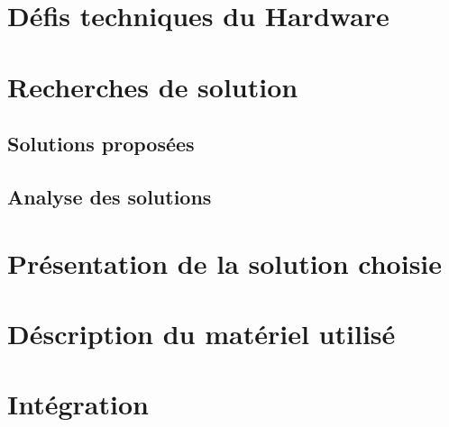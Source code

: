 \section{Défis techniques du Hardware}
\section{Recherches de solution}
\subsection{Solutions proposées}
\subsection{Analyse des solutions}
\section{Présentation de la solution choisie}
\section{Déscription du matériel utilisé}
\section{Intégration}
